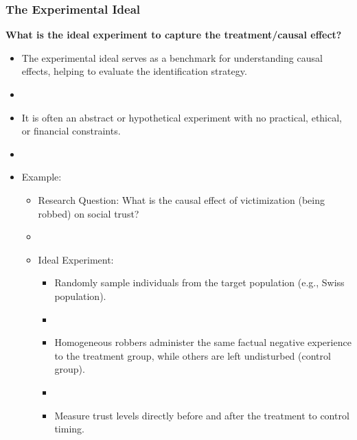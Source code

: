 \documentclass[xcolor=svgnames,t]{beamer}
\begin{document}
\begin{frame}
    \frametitle{The Experimental Ideal}

    \textbf{What is the ideal experiment to capture the treatment/causal effect?}
    \pause
    \begin{itemize}
        \item The experimental ideal serves as a benchmark for understanding causal effects, helping to evaluate the identification strategy.
        \item \pause
        \item It is often an abstract or hypothetical experiment with no practical, ethical, or financial constraints.
        \item \pause
        \item Example: \cite{bauer2015} 
        \begin{itemize}
            \pause
            \item Research Question: What is the causal effect of victimization (being robbed) on social trust?
            \item \pause
            \item Ideal Experiment: 
            \begin{itemize}
                \pause
                \item Randomly sample individuals from the target population (e.g., Swiss population).
                \item \pause
                \item Homogeneous robbers administer the same factual negative experience to the treatment group, while others are left undisturbed (control group).
                \item \pause
                \item Measure trust levels directly before and after the treatment to control timing.
            \end{itemize}
        \end{itemize}
    \end{itemize}
    
    
\end{frame}
\end{document}

